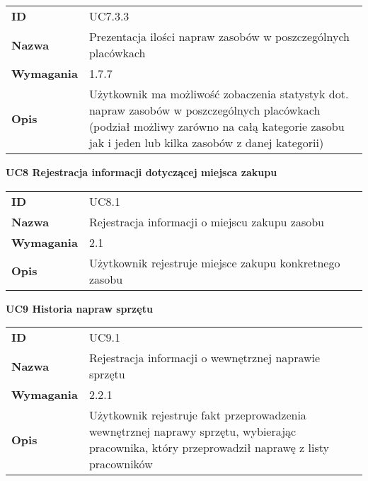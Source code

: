 \vspace{.05\textheight}

\begin{tabular}{p{}p{}}
\hfill {\bf ID} & UC7.3.3 \\
\hfill {\bf Nazwa} & Prezentacja ilości napraw zasobów w poszczególnych placówkach \\
\hfill {\bf Wymagania} & 1.7.7 \\
\hfill {\bf Opis} &  Użytkownik ma możliwość zobaczenia statystyk dot. napraw zasobów w poszczególnych placówkach (podział możliwy zarówno na całą kategorie zasobu jak i jeden lub kilka zasobów z danej kategorii) \\
\end{tabular}

\vspace{.03\textheight}
\begin{center}
  {\Large\bf UC8 Rejestracja informacji dotyczącej miejsca zakupu} \\
\end{center}
\vspace{.02\textheight}


\begin{tabular}{p{}p{}}
\hfill {\bf ID} & UC8.1 \\
\hfill {\bf Nazwa} & Rejestracja informacji o miejscu zakupu zasobu  \\
\hfill {\bf Wymagania} &  2.1 \\
\hfill {\bf Opis} &  Użytkownik rejestruje miejsce zakupu konkretnego zasobu \\
\end{tabular}

\vspace{.03\textheight}
\begin{center}
  {\Large\bf UC9 Historia napraw sprzętu} \\
\end{center}
\vspace{.02\textheight}

\begin{tabular}{p{}p{}}
\hfill {\bf ID} & UC9.1 \\
\hfill {\bf Nazwa} & Rejestracja informacji o wewnętrznej naprawie sprzętu \\
\hfill {\bf Wymagania} &  2.2.1 \\
\hfill {\bf Opis} & Użytkownik rejestruje fakt przeprowadzenia wewnętrznej naprawy sprzętu, wybierając pracownika, który przeprowadził naprawę z listy pracowników \\
\end{tabular}

